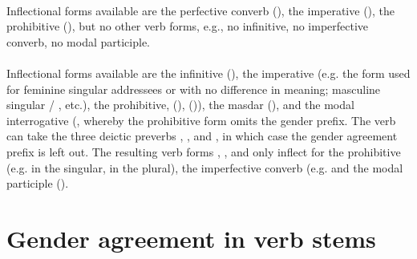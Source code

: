 \paragraph*{}
		Inflectional forms available are the perfective converb (), the imperative (), the prohibitive (), but no other verb forms, e.g., no infinitive, no imperfective converb, no modal participle.
		
\paragraph*{}
		Inflectional forms available are the infinitive (), the imperative (e.g. the form used for feminine singular addressees  or  with no difference in meaning; masculine singular  / , etc.), the prohibitive,  (),  ()), the masdar (), and the modal interrogative (, whereby the prohibitive form omits the gender prefix. The verb can take the three deictic preverbs , , and , in which case the gender agreement prefix is left out. The resulting verb forms , , and  only inflect for the prohibitive (e.g.  in the singular,  in the plural), the imperfective converb (e.g.  and the modal participle ().



\section{Gender agreement in verb stems}
\label{sec:Gender agreementVerb}


